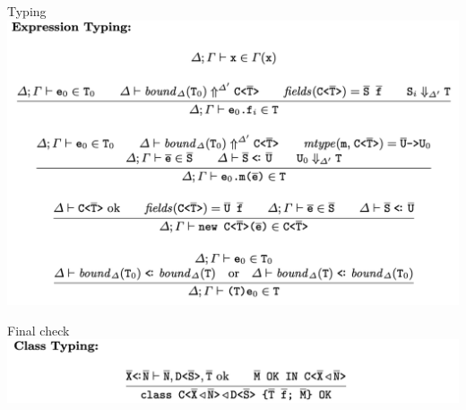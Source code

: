 \documentclass[usenames,dvipsnames]{beamer}
\begin{document}
\begin{frame}{Typing}
\centering
\includegraphics[scale=0.25]{img/type3}
\end{frame}

\begin{frame}{Final check}
\centering
\includegraphics[scale=0.25]{img/type4}
\end{frame}
\end{document}
